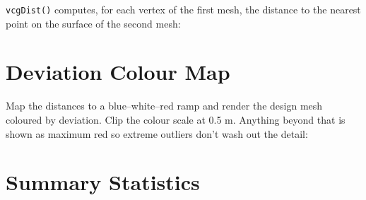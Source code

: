 \documentclass[
  11pt,
  letterpaper,
  DIV=11,
  numbers=noendperiod]{scrreprt}
\newenvironment{Shaded}{\begin{snugshade}}{\end{snugshade}}
\newcommand{\AttributeTok}[1]{\textcolor[rgb]{0.40,0.45,0.13}{#1}}
\newcommand{\CommentTok}[1]{\textcolor[rgb]{0.37,0.37,0.37}{#1}}
\newcommand{\DecValTok}[1]{\textcolor[rgb]{0.68,0.00,0.00}{#1}}
\newcommand{\FloatTok}[1]{\textcolor[rgb]{0.68,0.00,0.00}{#1}}
\newcommand{\FunctionTok}[1]{\textcolor[rgb]{0.28,0.35,0.67}{#1}}
\newcommand{\NormalTok}[1]{\textcolor[rgb]{0.00,0.23,0.31}{#1}}
\newcommand{\OtherTok}[1]{\textcolor[rgb]{0.00,0.23,0.31}{#1}}
\newcommand{\SpecialCharTok}[1]{\textcolor[rgb]{0.37,0.37,0.37}{#1}}
\newcommand{\StringTok}[1]{\textcolor[rgb]{0.13,0.47,0.30}{#1}}
\begin{document}
\texttt{vcgDist()} computes, for each vertex of the first mesh, the
distance to the nearest point on the surface of the second mesh:

\begin{Shaded}
\end{Shaded}

\section{Deviation Colour Map}\label{deviation-colour-map}

Map the distances to a blue--white--red ramp and render the design mesh
coloured by deviation. Clip the colour scale at 0.5 m. Anything beyond
that is shown as maximum red so extreme outliers don't wash out the
detail:

\begin{Shaded}
\end{Shaded}

\section{Summary Statistics}\label{summary-statistics}
\end{document}
